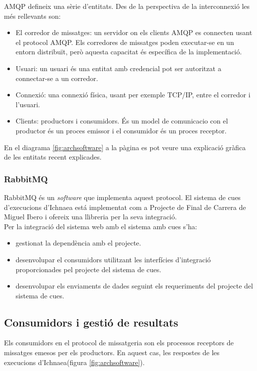 AMQP defineix una s\`{e}rie d'entitats. Des de la perspectiva de la interconnexió les m\'{e}s rellevants son:
\begin{itemize}
\item El corredor de missatges: un servidor on els clients AMQP es connecten usant el protocol AMQP. Els corredores de missatges poden executar-se en un entorn distribuït, però aquesta capacitat \'{e}s espec\'{i}fica de la implementació.
\item Usuari: un usuari \'{e}s una entitat amb credencial pot ser autoritzat a connectar-se a un corredor.
\item Connexió: una connexi\'{o} f\'{i}sica, usant per exemple TCP/IP, entre el corredor i l'usuari.
\item Clients: productors i consumidors. \'{E}s un model de comunicacio con el productor \'{e}s un proces emissor  i el consumidor \'{e}s un proces receptor.\cite{messaging}
\end{itemize}

En el diagrama \ref{fig:archsoftware} a la p\`{a}gina \pageref{fig:archsoftware} es pot veure una explicació gràfica de les entitats recent explicades.\\

\subsubsection{RabbitMQ} 
RabbitMQ \'{e}s un \textit{software} que implementa aquest protocol. El sistema de cues d'execucions d'Ichnaea est\'{a} implementat com a Projecte de Final de Carrera de Miguel Ibero i ofereix una llibreria per la seva integració.\\

Per la integració del sistema web amb el sistema amb cues s'ha:
\begin{itemize}
\item gestionat la dependència amb el projecte.
\item desenvolupar el consumidors utilitzant les interfícies d'integració proporcionades pel projecte del sistema de cues.
\item desenvolupar els enviaments de dades seguint els requeriments del projecte del sistema de cues.
\end{itemize}

\subsection{Consumidors i gesti\'{o} de resultats}
Els consumidors en el protocol de missatgeria son els processos receptors de missatges emesos per els productors. En aquest cas, les respostes de les execucions d'Ichnaea(figura \ref{fig:archsoftware}).\\

